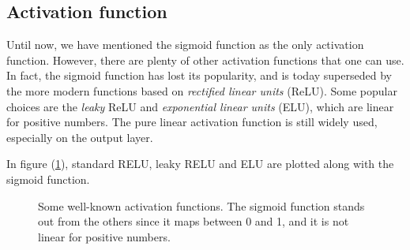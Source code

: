 \subsection{Activation function}
Until now, we have mentioned the sigmoid function as the only activation function. However, there are plenty of other activation functions that one can use. In fact, the sigmoid function has lost its popularity, and is today superseded by the more modern functions based on \textit{rectified linear units} (ReLU). Some popular choices are the \textit{leaky} ReLU and \textit{exponential linear units} (ELU), which are linear for positive numbers. The pure linear activation function is still widely used, especially on the output layer. 

In figure (\ref{fig:activation_functions}), standard RELU, leaky RELU and ELU are plotted along with the sigmoid function.

\begin{figure}
	\centering
	\caption{Some well-known activation functions. The sigmoid function stands out from the others since it maps between 0 and 1, and it is not linear for positive numbers.}%
	\label{fig:activation_functions}%
\end{figure}


